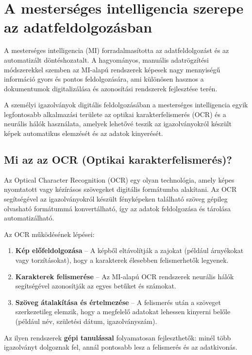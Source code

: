 \documentclass[
]{thesis-ekf}
\theoremstyle{definition}
\theoremstyle{remark}
\begin{document}
	\chapter{A mesterséges intelligencia szerepe az adatfeldolgozásban}
	A mesterséges intelligencia (MI) forradalmasította az adatfeldolgozást és az automatizált döntéshozatalt. A hagyományos, manuális adatrögzítési módszerekkel szemben az MI-alapú rendszerek képesek nagy mennyiségű információ gyors és pontos feldolgozására, ami különösen hasznos a dokumentumok digitalizálása és azonosítási rendszerek fejlesztése terén.
	
	A személyi igazolványok digitális feldolgozásában a mesterséges intelligencia egyik legfontosabb alkalmazási területe az optikai karakterfelismerés (OCR) és a neurális hálók használata, amelyek lehetővé teszik az igazolványokról készült képek automatikus elemzését és az adatok kinyerését.
	
	\section{Mi az az OCR (Optikai karakterfelismerés)?}
	Az Optical Character Recognition (OCR) egy olyan technológia, amely képes nyomtatott vagy kézírásos szövegeket digitális formátumba alakítani. Az OCR segítségével az igazolványokról készült fényképeken található szöveg gépileg olvasható formátummá konvertálható, így az adatok feldolgozása és tárolása automatizálható.
	
	Az OCR működésének lépései:
	\begin{enumerate}
		\item \textbf{Kép előfeldolgozása} -- A képből eltávolítják a zajokat (például árnyékokat vagy torzításokat), hogy a karakterek élesebben felismerhetők legyenek.
		\item \textbf{Karakterek felismerése} -- Az MI-alapú OCR rendszerek neurális hálók segítségével azonosítják az egyes betűket és számokat.
		\item \textbf{Szöveg átalakítása és értelmezése} -- A felismerés után a szöveget szerkezetileg elemzik, hogy a megfelelő adatokat lehessen kinyerni belőle (például név, születési dátum, igazolványszám).
	\end{enumerate}
	
	Az ilyen rendszerek \textbf{gépi tanulással} folyamatosan fejleszthetők: minél több igazolványt dolgoznak fel, annál pontosabb lesz a felismerés és az adatkivonás.
\end{document}
